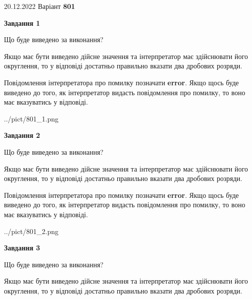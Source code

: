 \documentclass[12pt, ukrainian]{article}
\begin{document}
{20.12.2022 Варіант \No \textbf { 801 }\par}
{
\begin {Large}

{\begin {center}\textbf{Завдання 1}\end {center}}\par
Що буде виведено за виконання? \par

Якщо має бути виведено дійсне значення та інтерпретатор має здійснювати його округлення, 
то у відповіді достатньо правильно вказати два дробових розряди.

Повідомлення інтерпретатора про помилку позначати \textbf{error}.
Якщо щось буде виведено до того, як інтерпретатор видасть повідомлення про помилку, 
то воно має вказуватись у відповіді. \par

\begin{center}
	{../pict/801_1.png}
\end{center}
\newpage

{\begin {center}\textbf{Завдання 2}\end {center}}\par
Що буде виведено за виконання? \par

Якщо має бути виведено дійсне значення та інтерпретатор має здійснювати його округлення, 
то у відповіді достатньо правильно вказати два дробових розряди.

Повідомлення інтерпретатора про помилку позначати \textbf{error}.
Якщо щось буде виведено до того, як інтерпретатор видасть повідомлення про помилку, 
то воно має вказуватись у відповіді. \par

\begin{center}
	{../pict/801_2.png}
\end{center}
\newpage

{\begin {center}\textbf{Завдання 3}\end {center}}\par
Що буде виведено за виконання? \par

Якщо має бути виведено дійсне значення та інтерпретатор має здійснювати його округлення, 
то у відповіді достатньо правильно вказати два дробових розряди.


\end{Large}}
\end{document}
